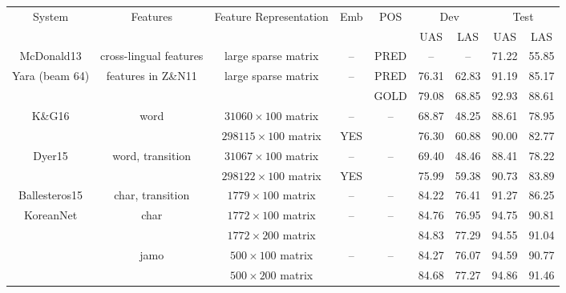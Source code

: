 \documentclass[11pt,letterpaper]{article}
\newcommand{\by}{\ensuremath{\times}}
\begin{document}
\begin{CJK}{UTF8}{gbsn}
\begin{table*}[t!]
\begin{center}
{\small
\begin{tabular}{|c|c|c|c|c|c|c|c|c|}
\hline
System            &      Features     &      Feature Representation   &   Emb     &   POS  & \multicolumn{2}{|c|}{Dev}  & \multicolumn{2}{|c|}{Test} \\
                  &                   &                               &           &        & \multicolumn{1}{|c}{UAS}   & \multicolumn{1}{c|}{LAS} &  \multicolumn{1}{|c}{UAS}   & \multicolumn{1}{c|}{LAS} \\
\hline
McDonald13        &   cross-lingual features    &   large sparse matrix       & -- & PRED & --    & -- & 71.22 & 55.85 \\
Yara (beam 64)    &   features in  Z\&N11       &   large sparse matrix       & -- & PRED & 76.31 & 62.83 & 91.19 & 85.17 \\
                  &                             &                             &    & GOLD & 79.08 & 68.85 & 92.93 & 88.61 \\
K\&G16            &    word                     &   $31060 \by 100$  matrix   & -- & --   & 68.87 & 48.25 & 88.61 & 78.95 \\
                  &                             &   $298115 \by 100$  matrix  & YES&      & 76.30 & 60.88 & 90.00 & 82.77 \\
Dyer15            &      word, transition       &   $31067 \by 100$  matrix   & -- & --   & 69.40 & 48.46 & 88.41 & 78.22 \\
                  &                             &   $298122 \by 100$ matrix   & YES&      & 75.99 & 59.38 & 90.73 & 83.89 \\
Ballesteros15     &      char, transition       &   $1779 \by 100$ matrix     & -- & --   & 84.22 & 76.41 & 91.27 & 86.25 \\
\hline
\hline
KoreanNet     &    char        &      $1772 \by 100$  matrix   & --  &  --    &  84.76      & 76.95        & 94.75   & 90.81  \\
              &                &      $1772 \by 200$  matrix   &     &        &  84.83      & 77.29        & 94.55   & 91.04 \\
              &    jamo        &      $500 \by 100$  matrix    & --  &  --    &  84.27	 & 76.07        & 94.59   & 90.77 \\
              &                &      $500 \by 200$  matrix    &     &        &  84.68      & 77.27        & 94.86   & 91.46 \\

\end{tabular}}
\end{center}
\end{table*}
\end{CJK}
\end{document}

